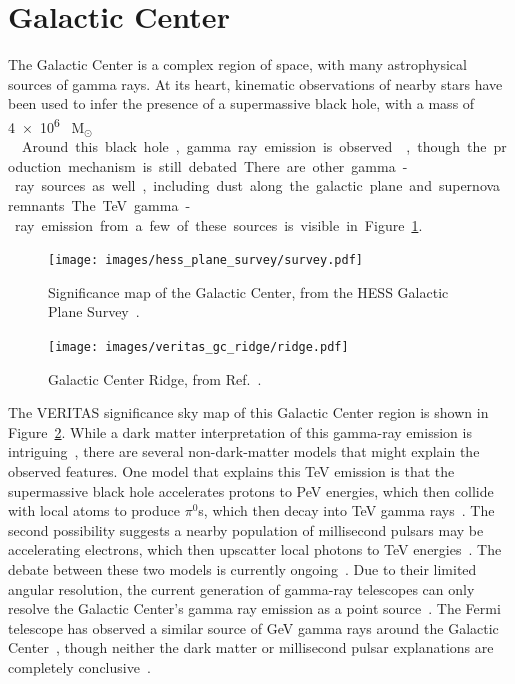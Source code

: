 \FloatBarrier

\section{Galactic Center}
  
  The Galactic Center is a complex region of space, with many astrophysical sources of gamma rays.
  At its heart, kinematic observations of nearby stars have been used to infer the presence of a supermassive black hole, with a mass of \SI{4e6}{ M${{}_\odot}$ }~\cite{sgra_massdist}.
  Around this black hole, gamma ray emission is observed~\cite{gc_pointsrc_hess,gc_pointsource_hess2,gc_veritas_pointsource,gc_magic_pointsource}, though the production mechanism is still debated.
  There are other gamma-ray sources as well, including dust along the galactic plane and supernova remnants.
  The TeV gamma-ray emission from a few of these sources is visible in Figure~\ref{fig:hess_plane}.
  
  \begin{figure}[!t]
    \centering
    \texttt{[image: images/hess\_plane\_survey/survey.pdf]}
    \caption[HESS GC Survey]{
      Significance map of the Galactic Center, from the HESS Galactic Plane Survey~\cite{hess_gc_plane}.
      \CaptionBlankLine
    }
    \label{fig:hess_plane}
  \end{figure}
  
  \begin{figure}[!b]
    \centering
    \texttt{[image: images/veritas\_gc\_ridge/ridge.pdf]}
    \caption[VERITAS View of the Galactic Center Ridge]{
      Galactic Center Ridge, from Ref.~\cite{VeritasGCRidge2015}.
      \CaptionBlankLine
    }
    \label{fig:veritas_gc_ridge}
  \end{figure}

  The VERITAS significance sky map of this Galactic Center region is shown in Figure~\ref{fig:veritas_gc_ridge}.
  While a dark matter interpretation of this gamma-ray emission is intriguing~\cite{gc_pnt_is_dm1,gc_pnt_is_dm2}, there are several non-dark-matter models that might explain the observed features.
  One model that explains this TeV emission is that the supermassive black hole accelerates protons to PeV energies, which then collide with local atoms to produce $\pi^0$s, which then decay into TeV gamma rays~\cite{gc_pevatron}.
  The second possibility suggests a nearby population of millisecond pulsars may be accelerating electrons, which then upscatter local photons to TeV energies~\cite{gc_pulsars,gc_pnt_is_not_dm2,gc_pnt_is_not_dm3}.
  The debate between these two models is currently ongoing~\cite{gc_pev_or_pwn}.
  Due to their limited angular resolution, the current generation of gamma-ray telescopes can only resolve the Galactic Center's gamma ray emission as a point source~\cite{VeritasGCRidge2015,gc_pointsrc_hess}.
  The Fermi telescope has observed a similar source of GeV gamma rays around the Galactic Center~\cite{gc_fermi_dm}, though neither the dark matter or millisecond pulsar explanations are completely conclusive~\cite{fermi_gc_pulsar_vs_dm}.
  
